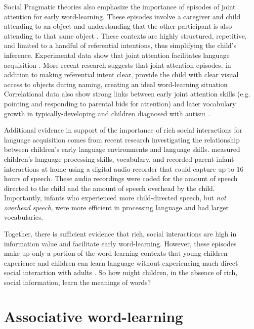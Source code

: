 \documentclass[man]{apa2}
\begin{document}
Social Pragmatic theories also emphasize the importance of episodes of joint attention for early word-learning. These episodes involve a caregiver and child attending to an object and understanding that the other participant is also attending to that same object \cite{carpenter1995joint, tomasello1983joint}. These contexts are highly structured, repetitive, and limited to a handful of referential intentions, thus simplifying the child's inference. Experimental data show that joint attention facilitates language acquisition \cite{brooks2008infant,farrar1993event}. More recent research suggests that joint attention episodes, in addition to making referential intent clear, provide the child with clear visual access to objects during naming, creating an ideal word-learning situation \cite{yu2012embodied}. Correlational data also show strong links between early joint attention skills (e.g. pointing and responding to parental bids for attention) and later vocabulary growth in typically-developing \cite{tomasello1986joint, carpenter1998social,farrant2012early} and children diagnosed with autism \cite{mundy1990longitudinal}.

Additional evidence in support of the importance of rich social interactions for language acquisition comes from recent research investigating the relationship between children's early language environments and language skills.  measured children's language processing skills, vocabulary, and recorded parent-infant interactions at home using a digital audio recorder that could capture up to 16 hours of speech. These audio recordings were coded for the amount of speech directed to the child and the amount of speech overhead by the child. Importantly, infants who experienced more child-directed speech, but \emph{not overhead speech}, were more efficient in processing language and had larger vocabularies. 

Together, there is sufficient evidence that rich, social interactions are high in information value and facilitate early word-learning. However, these episodes make up only a portion of the word-learning contexts that young children experience \cite{frank2013social} and children can learn language without experiencing much direct social interaction with adults \cite{shneidman2012language}. So how might children, in the absence of rich, social information, learn the meanings of words? 


\section{Associative word-learning}
\end{document}

